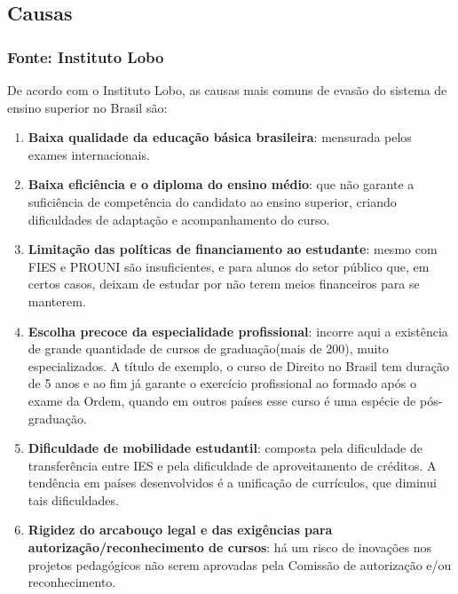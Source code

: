 \documentclass{report}
\begin{document}
\subsection{Causas}

\subsubsection{Fonte: Instituto Lobo}
De acordo com o Instituto Lobo\cite{evasao_panorama2}, as causas mais comuns de evasão do sistema de ensino superior no Brasil são:

\begin{enumerate}

\item \textbf{Baixa qualidade da educação básica brasileira}: mensurada pelos exames internacionais.

\item \textbf{Baixa eficiência e o diploma do ensino médio}: que não garante a suficiência de competência do candidato ao ensino superior, criando dificuldades de adaptação e acompanhamento do curso.

\item \textbf{Limitação das políticas de financiamento ao estudante}: mesmo com FIES e PROUNI são insuficientes, e para alunos do setor público que, em certos casos, deixam de estudar por não terem meios financeiros para se manterem.

\item \textbf{Escolha precoce da especialidade profissional}: incorre aqui a existência de grande quantidade de cursos de graduação(mais de 200), muito especializados. A título de exemplo, o curso de Direito no Brasil tem duração de 5 anos e ao fim já garante o exercício profissional ao formado após o exame da Ordem, quando em outros países esse curso é uma espécie de pós-graduação.

\item \textbf{Dificuldade de mobilidade estudantil}: composta pela dificuldade de transferência entre IES e pela dificuldade de aproveitamento de créditos. A tendência em países desenvolvidos é a unificação de currículos, que diminui tais dificuldades.

\item \textbf{Rigidez do arcabouço legal e das exigências para autorização/reconhecimento de cursos}: há um risco de inovações nos projetos pedagógicos não serem aprovadas pela Comissão de autorização e/ou reconhecimento.


\end{enumerate}
\end{document}
